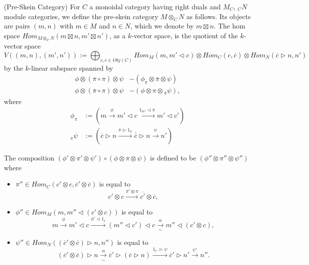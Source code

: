 \begin{definition}\label{pre-skein} (Pre-Skein Category)
  For $C$ a monoidal category having right duals
  and $M_C$, $_{C}N$ module categories, we define
  the pre-skein category $M\otimes_C N$ as follows. Its objects are pairs
  $(m,n)$ with $m\in M$ and $n\in N$, which we denote by $m\boxtimes n$. The
  hom space $Hom_{M\otimes_C N}(m\boxtimes n, m'\boxtimes n')$, as a
  $k$-vector space, is the quotient of the $k$-vector
  space $$V((m,n),(m',n')):=\bigoplus_{c,\overline{c} \in Obj(C)} Hom_{M}(m,
  m' \lhd c) \otimes Hom_{C}(c,\overline{c}) \otimes Hom_{N}
  (\overline{c} \rhd n, n')$$ by the $k$-linear subspace spanned by
  \begin{align}
    \phi \otimes (\overline{\pi} \circ \pi) \otimes \psi &- (\phi_{\pi} \otimes \overline{\pi} \otimes \psi) \label{relation/a} \\
    \phi \otimes (\overline{\pi} \circ \pi) \otimes \psi &- (\phi \otimes \pi \otimes {}_{\overline{\pi}}\psi) \label{relation/b},
  \end{align}
  where
  \begin{align}
    \phi_{\pi}  &:= \left( m \xrightarrow{\phi} m' \lhd c \xrightarrow{1_{m'} \lhd \pi} m' \lhd c' \right) \\
    {}_{\overline{\pi}}\psi &:= \left( \overline{c} \rhd n \xrightarrow{\overline{\pi} \rhd 1_{n}} \overline{\overline{c}} \rhd n \xrightarrow{\psi} n' \right)
  \end{align}
  
    \begin{center}
    
  \end{center}
  
  \noindent The composition $(\phi' \otimes \pi' \otimes \psi' ) \circ
  (\phi \otimes \pi \otimes \psi)$ is defined to be
  $(\phi'' \otimes \pi'' \otimes \psi'')$ where

  \begin{itemize}
    \item
    $\pi'' \in Hom_{C}(c' \otimes c, \overline{c}' \otimes \overline{c})$ is equal to
    \[
      c' \otimes c \xrightarrow{\pi' \otimes \pi} \overline{c'} \otimes \overline{c},
    \]
    \item
    \noindent $\phi'' \in Hom_{M}(m, m'' \lhd (c' \otimes c))$ is equal to
    \[
      m \xrightarrow{\phi} m' \lhd c \xrightarrow{\phi' \lhd 1_{c}} (m'' \lhd c') \lhd c \xrightarrow[\sim]{\alpha} m'' \lhd (c' \otimes c),
    \]
    \item
    \noindent $\psi'' \in Hom_{N}((\overline{c}' \otimes \overline{c}) \rhd n, n'')$ is equal to
    \[
      (\overline{c}' \otimes \overline{c}) \rhd n \xrightarrow[\sim]{\alpha} \overline{c}' \rhd (\overline{c} \rhd n) \xrightarrow{1_{\overline{c}'} \rhd \psi} \overline{c}' \rhd n' \xrightarrow{\psi'} n''.
    \]
  \end{itemize}
  

\end{definition}
